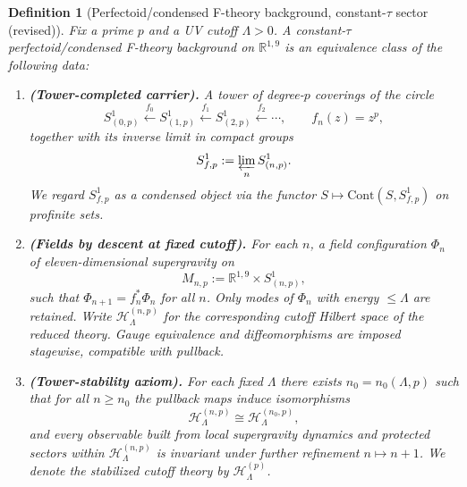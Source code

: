 \documentclass[11pt]{article}
\newtheorem{definition}[theorem]{Definition}
\theoremstyle{remark}
\begin{document}

\begin{definition}[Perfectoid/condensed F-theory background, constant-$\tau$ sector (revised)]
Fix a prime $p$ and a UV cutoff $\Lambda>0$.
A \emph{constant-$\tau$ perfectoid/condensed F-theory background} on $\mathbb{R}^{1,9}$
is an equivalence class of the following data:
\begin{enumerate}
\item \textbf{(Tower-completed carrier).}
A tower of degree-$p$ coverings of the circle
\begin{equation}
S^{1}_{(0,p)} \xleftarrow{\,f_{0}\,} S^{1}_{(1,p)} \xleftarrow{\,f_{1}\,} S^{1}_{(2,p)} \xleftarrow{\,f_{2}\,} \cdots,
\qquad f_n(z)=z^{p},
\end{equation}
together with its inverse limit in compact groups
\begin{equation}
S^{1}_{f,p} := \varprojlim_{n} S^{1}_{(n,p)}.
\end{equation}
We regard $S^{1}_{f,p}$ as a condensed object via the functor
$S \mapsto \mathrm{Cont}(S,S^{1}_{f,p})$ on profinite sets.

\item \textbf{(Fields by descent at fixed cutoff).}
For each $n$, a field configuration $\Phi_n$ of eleven-dimensional supergravity on
\begin{equation}
M_{n,p} := \mathbb{R}^{1,9}\times S^{1}_{(n,p)},
\end{equation}
such that $\Phi_{n+1}=f_n^{*}\Phi_n$ for all $n$.
Only modes of $\Phi_n$ with energy $\le \Lambda$ are retained.
Write $\mathcal{H}^{(n,p)}_{\Lambda}$ for the corresponding cutoff Hilbert space of the reduced theory.
Gauge equivalence and diffeomorphisms are imposed stagewise, compatible with pullback.

\item \textbf{(Tower-stability axiom).}
For each fixed $\Lambda$ there exists $n_{0}=n_{0}(\Lambda,p)$ such that for all $n\ge n_{0}$
the pullback maps induce isomorphisms
\begin{equation}
\mathcal{H}^{(n,p)}_{\Lambda} \cong \mathcal{H}^{(n_{0},p)}_{\Lambda},
\end{equation}
and every observable built from local supergravity dynamics and protected sectors within
$\mathcal{H}^{(n,p)}_{\Lambda}$ is invariant under further refinement $n\mapsto n+1$.
We denote the stabilized cutoff theory by $\mathcal{H}^{(p)}_{\Lambda}$.


\end{enumerate}
\end{definition}
\end{document}
